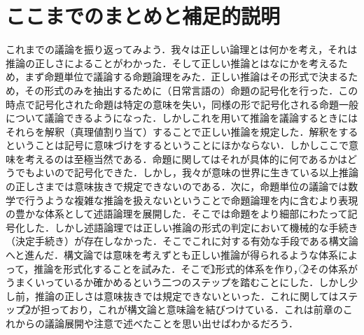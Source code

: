 \documentclass[10pt,b5paper,papersize,dvipdfmx]{jsbook}
\newcommand\maru[1]{\textcircled{\scriptsize{}#1}}
\begin{document}
\section{ここまでのまとめと補足的説明}
これまでの議論を振り返ってみよう．我々は正しい論理とは何かを考え，それは推論の正しさによることがわかった．そして正しい推論とはなにかを考えるため，まず命題単位で議論する命題論理をみた．正しい推論はその形式で決まるため，その形式のみを抽出するために（日常言語の）命題の記号化を行った．この時点で記号化された命題は特定の意味を失い，同様の形で記号化される命題一般について議論できるようになった．しかしこれを用いて推論を議論するときにはそれらを解釈（真理値割り当て）することで正しい推論を規定した．解釈をするということは記号に意味づけをするということにほかならない．しかしここで意味を考えるのは至極当然である．命題に関してはそれが具体的に何であるかはどうでもよいので記号化できた．しかし，我々が意味の世界に生きている以上推論の正しさまでは意味抜きで規定できないのである．次に，命題単位の議論では数学で行うような複雑な推論を扱えないということで命題論理を内に含むより表現の豊かな体系として述語論理を展開した．そこでは命題をより細部にわたって記号化した．しかし述語論理では正しい推論の形式の判定において機械的な手続き（決定手続き）が存在しなかった．そこでこれに対する有効な手段である構文論へと進んだ．構文論では意味を考えずとも正しい推論が得られるような体系によって，推論を形式化することを試みた．そこで\maru{1}形式的体系を作り，\maru{2}その体系がうまくいっているか確かめるという二つのステップを踏むことにした．しかし少し前，推論の正しさは意味抜きでは規定できないといった．これに関してはステップ\maru{2}が担っており，これが構文論と意味論を結びつけている．これは前章のこれからの議論展開や注意で述べたことを思い出せばわかるだろう．
\end{document}
